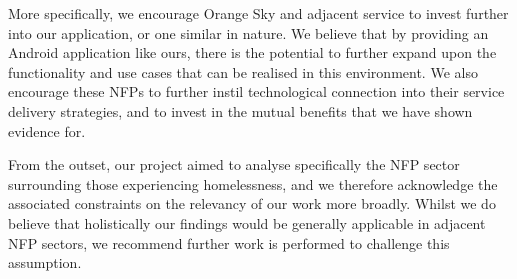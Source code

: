 More specifically, we encourage Orange Sky and adjacent service to invest further into our application, or one similar in nature. We believe that by providing an Android application like ours, there is the potential to further expand upon the functionality and use cases that can be realised in this environment. We also encourage these NFPs to further instil technological connection into their service delivery strategies, and to invest in the mutual benefits that we have shown evidence for.

From the outset, our project aimed to analyse specifically the NFP sector surrounding those experiencing homelessness, and we therefore acknowledge the associated constraints on the relevancy of our work more broadly. Whilst we do believe that holistically our findings would be generally applicable in adjacent NFP sectors, we recommend further work is performed to challenge this assumption.